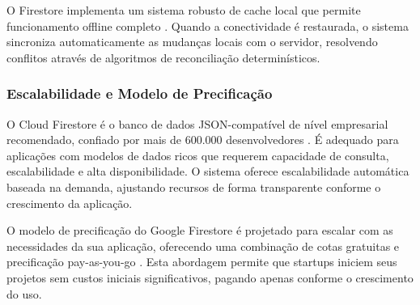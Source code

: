 O Firestore implementa um sistema robusto de cache local que permite funcionamento offline completo \cite{firebase_choose_database}. Quando a conectividade é restaurada, o sistema sincroniza automaticamente as mudanças locais com o servidor, resolvendo conflitos através de algoritmos de reconciliação determinísticos.

\begin{comment}
Uma característica distintiva do Firestore reside em suas capacidades de sincronização automática e atualizações em tempo real \cite{firebase2023realtime}. O sistema implementa listeners de dados que permitem às aplicações cliente receber notificações instantâneas sempre que ocorrem alterações nos dados armazenados, eliminando a necessidade de polling manual ou requisições periódicas para verificação de atualizações. Esta funcionalidade é fundamental para o desenvolvimento de aplicações colaborativas, sistemas de mensagens instantâneas e interfaces que requerem refletir mudanças de estado imediatas.

O mecanismo de sincronização offline representa outro aspecto tecnológico significativo, permitindo que aplicações continuem operando mesmo durante períodos de conectividade intermitente ou ausente \cite{terry2013replicated}. O Firestore mantém uma cache local dos dados utilizados pela aplicação, sincronizando automaticamente as alterações quando a conectividade é restabelecida, garantindo consistência eventual dos dados distribuídos.
\end{comment}
\subsubsection{Escalabilidade e Modelo de Precificação}

O Cloud Firestore é o banco de dados JSON-compatível de nível empresarial recomendado, confiado por mais de 600.000 desenvolvedores \cite{medium_firestore_overview}. É adequado para aplicações com modelos de dados ricos que requerem capacidade de consulta, escalabilidade e alta disponibilidade. O sistema oferece escalabilidade automática baseada na demanda, ajustando recursos de forma transparente conforme o crescimento da aplicação.

O modelo de precificação do Google Firestore é projetado para escalar com as necessidades da sua aplicação, oferecendo uma combinação de cotas gratuitas e precificação pay-as-you-go \cite{airbyte_firestore_pricing}. Esta abordagem permite que startups iniciem seus projetos sem custos iniciais significativos, pagando apenas conforme o crescimento do uso.

